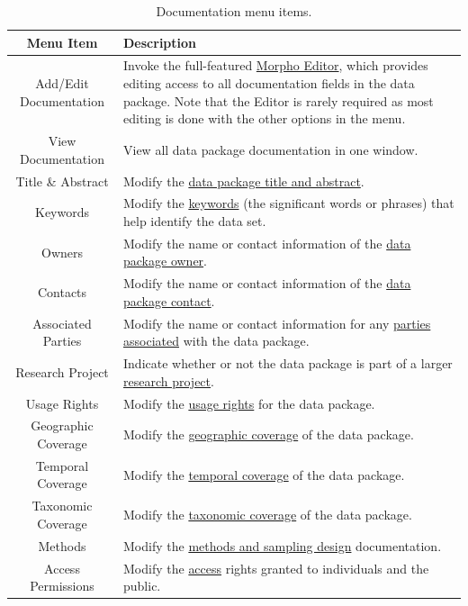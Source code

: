 \begin{table}[htbp]
  \centering
  \begin{tabular}{|c|m{}|}
  \hline
  \textbf{Menu Item} & \textbf{Description} \\
  \hline
  Add/Edit Documentation &
    Invoke the full-featured \hyperref[sec:edit-doc-tree]{Morpho
    Editor}, which provides editing access to all documentation fields
    in the data package. Note that the Editor is rarely required as most
    editing is done with the other options in the menu. \\
  \hline
  View Documentation &
    View all data package documentation in one window. \\
  \hline
  Title \& Abstract &
    Modify the \hyperref[sec:wizard-dp-title]{data package title and
    abstract}. \\
  \hline
  Keywords &
    Modify the \hyperref[sec:wizard-dp-keywords]{keywords} (the significant
    words or phrases) that help identify the data set. \\
  \hline
  Owners &
    Modify the name or contact information of the
    \hyperref[sec:wizard-dp-people]{data package owner}. \\
  \hline
  Contacts &
    Modify the name or contact information of the
    \hyperref[sec:wizard-dp-people]{data package contact}. \\
  \hline
  Associated Parties &
    Modify the name or contact information for any
    \hyperref[sec:wizard-dp-people]{parties associated} with the data
    package. \\
  \hline
  Research Project &
    Indicate whether or not the data package is part of a larger
    \hyperref[sec:wizard-dp-project]{research project}. \\
  \hline
  Usage Rights &
    Modify the \hyperref[sec:wizard-dp-usage]{usage rights} for the data
    package. \\
  \hline
  Geographic Coverage &
    Modify the \hyperref[sec:wizard-dp-coverage]{geographic coverage} of
    the data package. \\
  \hline
  Temporal Coverage &
    Modify the \hyperref[sec:wizard-dp-coverage]{temporal coverage} of
    the data package. \\
  \hline
  Taxonomic Coverage &
    Modify the \hyperref[sec:wizard-dp-coverage]{taxonomic coverage} of
    the data package. \\
  \hline
  Methods &
    Modify the \hyperref[sec:wizard-dp-methods]{methods and sampling
    design} documentation. \\
  \hline
  Access Permissions &
    Modify the \hyperref[sec:wizard-dp-access]{access} rights granted
    to individuals and the public. \\
  \hline
  \end{tabular}
  \caption{Documentation menu items.}
  \label{tab:edit-doc-items}
\end{table}

